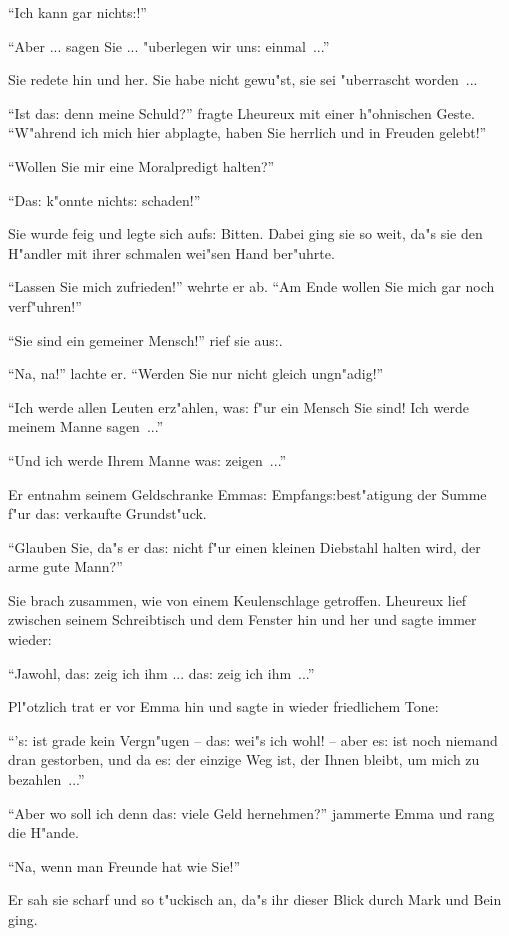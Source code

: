\documentclass[oneside,12pt]{book}
\newcommand{\s}{s:}%
\begin{document}
"`Ich kann gar nicht{\s}!"'

"`Aber ... sagen Sie ... "uberlegen wir un{\s} einmal~..."'

Sie redete hin und her. Sie habe nicht gewu"st, sie sei
"uberrascht worden~...

"`Ist da{\s} denn meine Schuld?"' fragte Lheureux mit einer
h"ohnischen Geste. "`W"ahrend ich mich hier abplagte, haben Sie
herrlich und in Freuden gelebt!"'

"`Wollen Sie mir eine Moralpredigt halten?"'

"`Da{\s} k"onnte nicht{\s} schaden!"'

Sie wurde feig und legte sich auf{\s} Bitten. Dabei ging sie so
weit, da"s sie den H"andler mit ihrer schmalen wei"sen Hand
ber"uhrte.

"`Lassen Sie mich zufrieden!"' wehrte er ab. "`Am Ende wollen Sie
mich gar noch verf"uhren!"'

"`Sie sind ein gemeiner Mensch!"' rief sie au{\s}.

"`Na, na!"' lachte er. "`Werden Sie nur nicht gleich ungn"adig!"'

"`Ich werde allen Leuten erz"ahlen, wa{\s} f"ur ein Mensch Sie
sind! Ich werde meinem Manne sagen~..."'

"`Und ich werde Ihrem Manne wa{\s} zeigen~..."'

Er entnahm seinem Geldschranke Emma{\s} Empfang{\s}best"atigung
der Summe f"ur da{\s} verkaufte Grundst"uck.

"`Glauben Sie, da"s er da{\s} nicht f"ur einen kleinen Diebstahl
halten wird, der arme gute Mann?"'

Sie brach zusammen, wie von einem Keulenschlage getroffen.
Lheureux lief zwischen seinem Schreibtisch und dem Fenster hin und
her und sagte immer wieder:

"`Jawohl, da{\s} zeig ich ihm ... da{\s} zeig ich ihm~..."'

Pl"otzlich trat er vor Emma hin und sagte in wieder friedlichem
Tone:

"`'{\s} ist grade kein Vergn"ugen -- da{\s} wei"s ich wohl! --
aber e{\s} ist noch niemand dran gestorben, und da e{\s} der
einzige Weg ist, der Ihnen bleibt, um mich zu bezahlen~..."'

"`Aber wo soll ich denn da{\s} viele Geld hernehmen?"' jammerte
Emma und rang die H"ande.

"`Na, wenn man Freunde hat wie Sie!"'

Er sah sie scharf und so t"uckisch an, da"s ihr dieser Blick durch
Mark und Bein ging.
\end{document}
